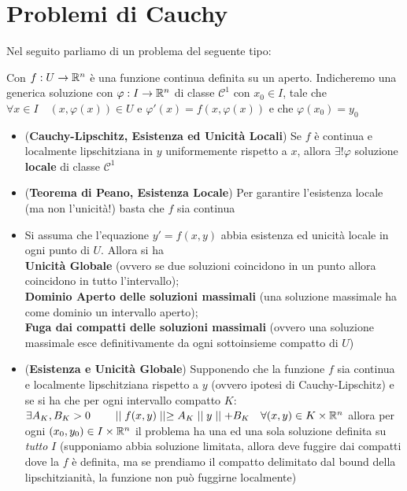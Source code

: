 \documentclass[a4paper,NoNotes,GeneralMath]{stdmdoc}
\begin{document}
	\section*{Problemi di Cauchy}
	Nel seguito parliamo di un problema del seguente tipo:
	\par
	Con $f: U \rightarrow \RR^n$ è una funzione continua definita su un aperto.
	Indicheremo una generica soluzione con $\varphi: I \rightarrow \RR^n$ di classe $\mathcal{C}^1$ con $x_0 \in I$, tale che $\forall x \in I \quad (x, \varphi(x)) \in U$ e $\varphi'(x) = f(x, \varphi(x))$ e che $\varphi(x_0) = y_0$
	\begin{itemize}
		\item ({\bf Cauchy-Lipschitz, Esistenza ed Unicità Locali}) Se $f$ è continua e localmente lipschitziana in $y$ uniformemente rispetto a $x$, allora $\exists! \varphi$ soluzione {\bf locale} di classe $\mathcal{C}^1$
		\item ({\bf Teorema di Peano, Esistenza Locale}) Per garantire l'esistenza locale (ma non l'unicità!) basta che $f$ sia continua
		\item Si assuma che l'equazione $y' = f(x,y)$ abbia esistenza ed unicità locale in ogni punto di $U$. Allora si ha \\ {\bf Unicità Globale} (ovvero se due soluzioni coincidono in un punto allora coincidono in tutto l'intervallo); \\ {\bf Dominio Aperto delle soluzioni massimali} (una soluzione massimale ha come dominio un intervallo aperto); \\ {\bf Fuga dai compatti delle soluzioni massimali} (ovvero una soluzione massimale esce definitivamente da ogni sottoinsieme compatto di $U$)
		\item ({\bf Esistenza e Unicità Globale}) Supponendo che la funzione $f$ sia continua e localmente lipschitziana rispetto a $y$ (ovvero ipotesi di Cauchy-Lipschitz) e se si ha che per ogni intervallo compatto $K$: $\exists A_K, B_K > 0 \qquad \Norm{f(x,y)} \ge A_K \Norm{y} + B_K \quad \forall (x,y) \in K \times \RR^n$ allora per ogni $(x_0, y_0) \in I\times \RR^n$ il problema ha una ed una sola soluzione definita su {\it tutto} $I$ (supponiamo abbia soluzione limitata, allora deve fuggire dai compatti dove la $f$ è definita, ma se prendiamo il compatto delimitato dal bound della lipschitzianità, la funzione non può fuggirne localmente)
	\end{itemize}
\end{document}
